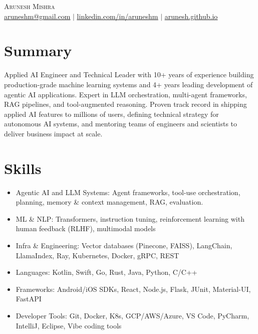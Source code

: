 \documentclass[letterpaper,10pt]{article}
\newcommand{\resumeItem}[1]{
  \item\small{
    {#1 \vspace{-2pt}}
  }
}
\begin{document}

\begin{center}
    {\LARGE \scshape Arunesh \hspace{3mm} Mishra} \\ \vspace{1pt}
    \footnotesize{\href{mailto:aruneshm@gmail.com}{\underline{aruneshm@gmail.com}} $|$ 
    \href{https://linkedin.com/in/...}{\underline{linkedin.com/in/aruneshm}} $|$
    \href{https://arunesh.github.io}{\underline{arunesh.github.io}}}
\end{center}



\section{Summary}
Applied AI Engineer and Technical Leader with 10+ years of experience building production-grade machine learning systems and 4+ years leading development of agentic AI applications. Expert in LLM orchestration, multi-agent frameworks, RAG pipelines, and tool-augmented reasoning. Proven track record in shipping applied AI features to millions of users, defining technical strategy for autonomous AI systems, and mentoring teams of engineers and scientists to deliver business impact at scale.

\section{Skills}
\begin{itemize}[leftmargin=3.5em, itemsep=0pt, label=\tiny$\bullet$]
  \resumeItem {Agentic AI and LLM Systems: Agent frameworks, tool-use orchestration, planning, memory \& context management, RAG, evaluation.}
  \resumeItem {ML \& NLP: Transformers, instruction tuning, reinforcement learning with human feedback (RLHF), multimodal models}
  \resumeItem {Infra \& Engineering: Vector databases (Pinecone, FAISS), LangChain, LlamaIndex, Ray, Kubernetes, Docker, gRPC, REST}
  \resumeItem {Languages: Kotlin, Swift, Go, Rust, Java, Python, C/C++} 
  \resumeItem {Frameworks: Android/iOS SDKs, React, Node.js, Flask, JUnit, Material-UI, FastAPI}
  \resumeItem {Developer Tools: Git, Docker, K8s, GCP/AWS/Azure, VS Code, PyCharm, IntelliJ, Eclipse, Vibe coding tools}
\end{itemize}
\end{document}

